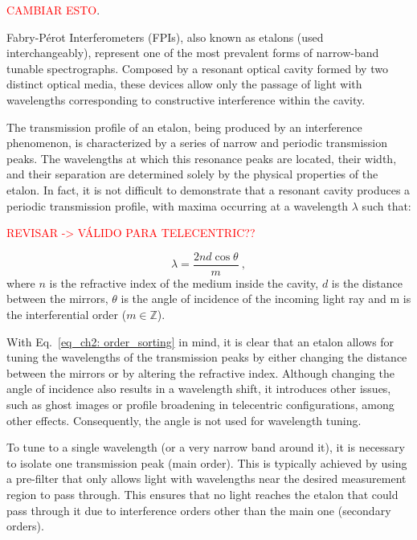 \textcolor{red}{CAMBIAR ESTO}.

Fabry-Pérot Interferometers (FPIs), also known as etalons (used interchangeably), represent one of the most prevalent forms of narrow-band tunable spectrographs. Composed by a resonant optical cavity formed by two distinct optical media, these devices allow only the passage of light with wavelengths corresponding to constructive interference within the cavity. 

The transmission profile of an etalon, being produced by an interference phenomenon, is characterized by a series of narrow and periodic transmission peaks. The wavelengths at which this resonance peaks are located, their width, and their separation are determined solely by the physical properties of the etalon. In fact, it is not difficult to demonstrate \citep{franI} that a resonant cavity produces a periodic transmission profile, with maxima occurring at a wavelength $\lambda$ such that:

\textcolor{red}{REVISAR -> VÁLIDO PARA TELECENTRIC??} 

\begin{equation}
\lambda = \frac{2nd\cos \theta}{m}\ ,
\label{eq_ch2: order_sorting}
\end{equation}
where $n$ is the refractive index of the medium inside the cavity, $d$ is the distance between the mirrors, $\theta$ is the angle of incidence of the incoming light ray and m is the interferential order ($m \in \mathbb{Z} $). 

With Eq.~\eqref{eq_ch2: order_sorting} in mind, it is clear that an etalon allows for tuning the wavelengths of the transmission peaks by either changing the distance between the mirrors or by altering the refractive index. Although changing the angle of incidence also results in a wavelength shift, it introduces other issues, such as ghost images or profile broadening in telecentric configurations, among other effects. Consequently, the angle is not used for wavelength tuning.

To tune to a single wavelength (or a very narrow band around it), it is necessary to isolate one transmission peak (main order). This is typically achieved by using a pre-filter that only allows light with wavelengths near the desired measurement region to pass through. This ensures that no light reaches the etalon that could pass through it due to interference orders other than the main one (secondary orders). 

